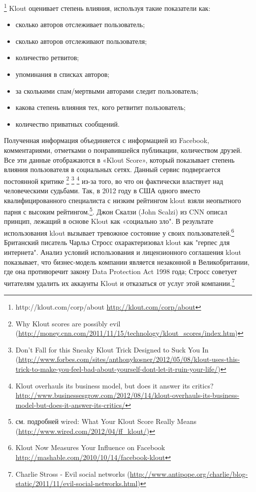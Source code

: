 \begin{itemize}
\begin{itemize}
\footnote{http://klout.com/corp/about \url{http://klout.com/corp/about}}
 Klout оценивает степень влияния, используя такие показатели как:
	\begin{itemize}
	\item сколько авторов отслеживает пользователь;
	\item сколько авторов отслеживают пользователя;
	\item количество ретвитов;
	\item упоминания в списках авторов;
	\item за сколькими спам/мертвыми авторами следит пользователь;
	\item какова степень влияния тех, кого ретвитит пользователь;
	\item количество приватных сообщений.
	\end{itemize}
Полученная информация объединяется с информацией из Facebook, комментариями, отметками о понравившейся публикации, количеством друзей. Все эти данные отображаются в «Klout Score», который показывает степень влияния пользователя в социальных сетях.
Данный сервис подвергается постоянной критике \footnote{Why Klout scores are possibly evil (\url {http://money.cnn.com/2011/11/15/technology/klout_scores/index.htm})}
\footnote{Don't Fall for this Sneaky Klout Trick Designed to Suck You In (\url{http://www.forbes.com/sites/anthonykosner/2012/05/08/klout-uses-this-trick-to-make-you-feel-bad-about-yourself-dont-let-it-ruin-your-life/})}
\footnote{Klout overhauls its business model, but does it answer its critics? \url{http://www.businessesgrow.com/2012/08/14/klout-overhauls-its-business-model-but-does-it-answer-its-critics/}}
 из-за того, во что он фактически властвует над человеческими судьбами. Так, в 2012 году в США одного вместо квалифицированного специалиста с низким рейтингом klout взяли неопытного парня с высоким рейтингом.\footnote{см. подробней wired: What Your Klout Score Really Means (\url{http://www.wired.com/2012/04/ff_klout/})}. Джон Скалзи (John Scalzi) из CNN описал принцип, лежащий в основе Klout как «социально зло". В результате использования klout  вызывает тревожное состояние у своих пользователей.\footnote{Klout Now Measures Your Influence on Facebook \url {http://mashable.com/2010/10/14/facebook-klout}}
 Британский писатель Чарльз Стросс охарактеризовал klout как "герпес для интернета". Анализ условий использования и лицензионного соглашения klout показывает, что бизнес-модель компании является незаконной в Великобритании, где она противоречит закону  Data Protection Act 1998 года; Стросс советует читателям удалить их аккаунты Klout и отказаться от услуг этой компании.\footnote{Charlie Stross - Evil social networks (\url {http://www.antipope.org/charlie/blog-static/2011/11/evil-social-networks.html})}

\end{itemize}
\end{itemize}
